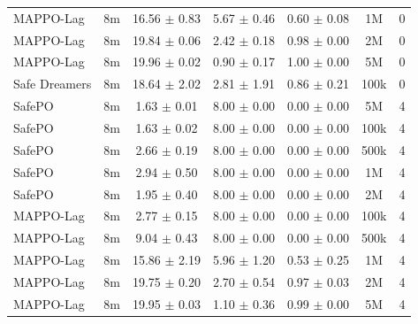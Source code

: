 \documentclass{article}
\begin{document}
\begin{longtable}{lcccccc}
MAPPO-Lag & 8m & \textcolor{green!60!black}{16.56 $\pm$ 0.83} & \textcolor{green!60!black}{5.67 $\pm$ 0.46} & \textcolor{green!60!black}{0.60 $\pm$ 0.08} & 1M & 0 \\
MAPPO-Lag & 8m & \textcolor{red!70!black}{19.84 $\pm$ 0.06} & \textcolor{red!70!black}{2.42 $\pm$ 0.18} & \textcolor{red!70!black}{0.98 $\pm$ 0.00} & 2M & 0 \\
MAPPO-Lag & 8m & \textcolor{red!70!black}{19.96 $\pm$ 0.02} & \textcolor{red!70!black}{0.90 $\pm$ 0.17} & \textcolor{red!70!black}{1.00 $\pm$ 0.00} & 5M & 0 \\
Safe Dreamers & 8m & 18.64 $\pm$ 2.02 & 2.81 $\pm$ 1.91 & 0.86 $\pm$ 0.21 & 100k & 0 \\
\midrule
SafePO & 8m & \textcolor{green!60!black}{1.63 $\pm$ 0.01} & \textcolor{green!60!black}{8.00 $\pm$ 0.00} & \textcolor{green!60!black}{0.00 $\pm$ 0.00} & 5M & 4 \\
SafePO & 8m & \textcolor{green!60!black}{1.63 $\pm$ 0.02} & \textcolor{green!60!black}{8.00 $\pm$ 0.00} & \textcolor{green!60!black}{0.00 $\pm$ 0.00} & 100k & 4 \\
SafePO & 8m & \textcolor{green!60!black}{2.66 $\pm$ 0.19} & \textcolor{green!60!black}{8.00 $\pm$ 0.00} & \textcolor{green!60!black}{0.00 $\pm$ 0.00} & 500k & 4 \\
SafePO & 8m & \textcolor{green!60!black}{2.94 $\pm$ 0.50} & \textcolor{green!60!black}{8.00 $\pm$ 0.00} & \textcolor{green!60!black}{0.00 $\pm$ 0.00} & 1M & 4 \\
SafePO & 8m & \textcolor{green!60!black}{1.95 $\pm$ 0.40} & \textcolor{green!60!black}{8.00 $\pm$ 0.00} & \textcolor{green!60!black}{0.00 $\pm$ 0.00} & 2M & 4 \\
MAPPO-Lag & 8m & \textcolor{green!60!black}{2.77 $\pm$ 0.15} & \textcolor{green!60!black}{8.00 $\pm$ 0.00} & \textcolor{green!60!black}{0.00 $\pm$ 0.00} & 100k & 4 \\
MAPPO-Lag & 8m & \textcolor{green!60!black}{9.04 $\pm$ 0.43} & \textcolor{green!60!black}{8.00 $\pm$ 0.00} & \textcolor{green!60!black}{0.00 $\pm$ 0.00} & 500k & 4 \\
MAPPO-Lag & 8m & \textcolor{green!60!black}{15.86 $\pm$ 2.19} & \textcolor{green!60!black}{5.96 $\pm$ 1.20} & \textcolor{green!60!black}{0.53 $\pm$ 0.25} & 1M & 4 \\
MAPPO-Lag & 8m & \textcolor{red!70!black}{19.75 $\pm$ 0.20} & \textcolor{red!70!black}{2.70 $\pm$ 0.54} & \textcolor{red!70!black}{0.97 $\pm$ 0.03} & 2M & 4 \\
MAPPO-Lag & 8m & \textcolor{red!70!black}{19.95 $\pm$ 0.03} & \textcolor{red!70!black}{1.10 $\pm$ 0.36} & \textcolor{red!70!black}{0.99 $\pm$ 0.00} & 5M & 4 \\

\end{longtable}
\end{document}
